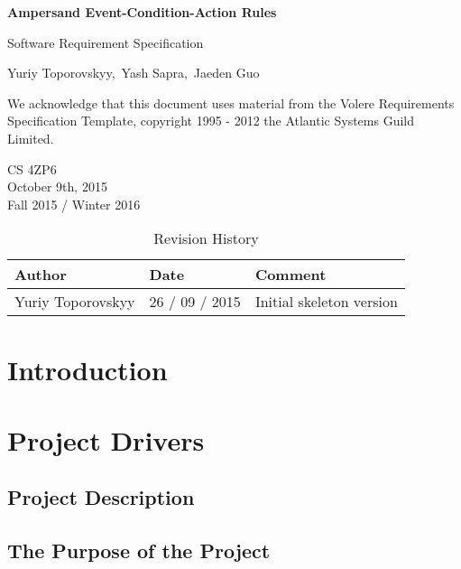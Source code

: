 \documentclass[12pt]{report}
\begin{document}
\begin{titlepage}\begin{center}
\vspace*{1cm}

{\Huge\textbf{Ampersand Event-Condition-Action Rules}}

\vspace{0.5cm}
{\Large Software Requirement Specification 
	

\vspace{1.5cm}
Yuriy Toporovskyy,\ Yash Sapra,\ Jaeden Guo}
\vfill

We acknowledge that this document uses material from the Volere Requirements
Specification Template, copyright 1995 - 2012 the Atlantic Systems Guild
Limited.

\vspace{0.8cm}
\end{center}
CS 4ZP6 \\
October 9th, 2015 \\ 
Fall 2015 / Winter 2016 
\end{titlepage}

\begin{table}[ht!]\begin{center}
\caption{Revision History}  
\begin{tabular}{|l|l|l|}\hline
\textbf{Author} & \textbf{Date} & \textbf{Comment} \\\hline 
Yuriy Toporovskyy & 26 / 09 / 2015 & Initial skeleton version \\\hline
\end{tabular}
\end{center}\end{table}

\tableofcontents
\listoffigures
\listoftables


{\chapter{Introduction}\label{ch:Intro}}
{\chapter{Project Drivers}\label{ch:Drivers}}

{\section{Project Description}\label{sec:Intro}}
{\section{The Purpose of the Project}\label{sec:Purpose}}
\end{document}
